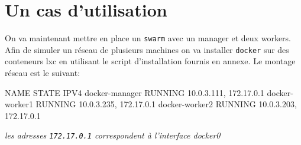 \section{Un cas d'utilisation}

On va maintenant mettre en place un \verb:swarm: avec un manager et deux workers. Afin de
simuler un réseau de plusieurs machines on va installer \verb:docker: sur des conteneurs
lxc en utilisant le script d'installation fournis en annexe. Le montage réseau est le suivant:
\begin{bash}
NAME           STATE            IPV4        
docker-manager RUNNING 10.0.3.111, 172.17.0.1
docker-worker1 RUNNING 10.0.3.235, 172.17.0.1
docker-worker2 RUNNING 10.0.3.203, 172.17.0.1
\end{bash} 
\begin{center}
    \emph{les adresses \verb:172.17.0.1: correspondent à l'interface docker0}
\end{center}

